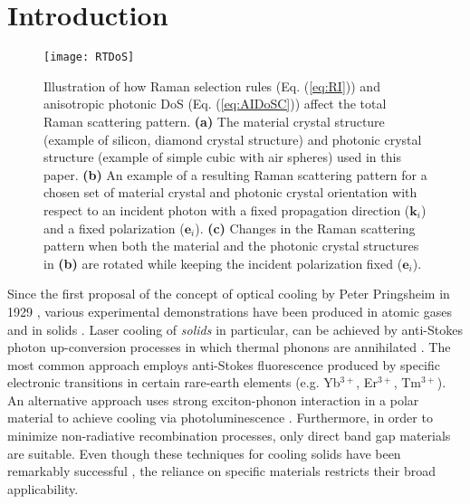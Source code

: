 \documentclass[%
 reprint,
superscriptaddress,
 amsmath,amssymb,
 aps,
pra,
]{revtex4-1}
\newcommand{\mb}[1]{\mathbf{#1}} %
\begin{document}
\section{Introduction}

\begin{figure*}[!ht]
\begin{center}
\texttt{[image: RTDoS]}
\caption{Illustration of how Raman selection rules (Eq. (\ref{eq:RI})) and anisotropic photonic DoS (Eq. (\ref{eq:AIDoSC})) affect the total Raman scattering pattern. \textbf{(a)} The material crystal structure (example of silicon, diamond crystal structure) and photonic crystal structure (example of simple cubic with air spheres) used in this paper. \textbf{(b)} An example of a resulting Raman scattering pattern for a chosen set of material crystal and photonic crystal orientation with respect to an incident photon with a fixed propagation direction ($\mb{k}_i$) and a fixed polarization ($\mb{e}_i$). \textbf{(c)} Changes in the Raman scattering pattern when both the material and the photonic crystal structures in \textbf{(b)} are rotated while keeping the incident polarization fixed ($\mb{e}_i$).}
\label{fig:RTDoS}
\end{center}
\end{figure*}

Since the first proposal of the concept of optical cooling by Peter Pringsheim in 1929 \cite{pringsheim1929zwei}, various experimental demonstrations have been produced in atomic gases \cite{hansch1975cooling,dalibard1985dressed,aspect1988laser} and in solids \cite{epstein1995observation,seletskiy2010laser,seletskiy2012cryogenic,melgaard2013optical,melgaard2014identification,zhang2013laser}. Laser cooling of \textit{solids} in particular, can be achieved by anti-Stokes photon up-conversion processes in which thermal phonons are annihilated \cite{PhysRevLett.92.247403,sheik2009laser,ding2012anti}. The most common approach employs anti-Stokes fluorescence produced by specific electronic transitions in certain rare-earth elements (e.g. Yb$^{3+}$, Er$^{3+}$, Tm$^{3+}$)\cite{epstein1995observation,seletskiy2010laser,seletskiy2012cryogenic,melgaard2013optical,melgaard2014identification}. 
An alternative approach uses strong exciton-phonon interaction in a polar material to achieve cooling via photoluminescence \cite{zhang2013laser}. Furthermore, in order to minimize non-radiative recombination processes, only direct band gap materials are suitable. Even though these techniques for cooling solids have been remarkably successful \cite{melgaard2013optical,melgaard2016solid}, the reliance on specific materials restricts their broad applicability. 
\end{document}
